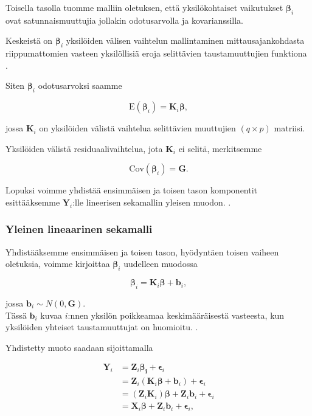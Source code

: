 \documentclass[finnish]{docopts}
\begin{document}
Toisella tasolla tuomme malliin oletuksen, että yksilökohtaiset vaikutukset $\bm{\beta}_i$ ovat satunnaismuuttujia jollakin odotusarvolla ja kovarianssilla.

Keskeistä on $\bm{\beta}_i$ yksilöiden välisen vaihtelun mallintaminen mittausajankohdasta riippumattomien vasteen yksilöllisiä eroja selittävien taustamuuttujien funktiona \citep{fitzmaurice11}.

Siten $\bm{\beta}_i$ odotusarvoksi saamme

$$
\text{E}(\bm{\beta}_i) = \bm{K}_i \bm{\beta},
$$

jossa $\bm{K}_i$ on yksilöiden välistä vaihtelua selittävien muuttujien $(q \times p)$ matriisi.

Yksilöiden välistä residuaalivaihtelua, jota $\bm{K}_i$ ei selitä, merkitsemme

$$
\text{Cov}(\bm{\beta}_i) = \bm{G}.
$$

Lopuksi voimme yhdistää ensimmäisen ja toisen tason komponentit esittääksemme $\bm{Y}_i$:lle lineerisen sekamallin yleisen muodon. \citep{fitzmaurice11, verbeke00}.\\

\subsubsection{Yleinen lineaarinen sekamalli}
\label{ssb:ylsm}

Yhdistääksemme ensimmäisen ja toisen tason, hyödyntäen toisen vaiheen oletuksia, voimme kirjoittaa $\bm{\beta}_i$ uudelleen muodossa

$$
\bm{\beta}_i = \bm{K}_i \bm{\beta} + \bm{b}_i,
$$

jossa $\bm{b}_i \sim N(0,\bm{G})$. \\

Tässä $\bm{b}_i$ kuvaa $i$:nnen yksilön poikkeamaa keskimääräisestä vasteesta, kun yksilöiden yhteiset taustamuuttujat on huomioitu. \citep{fitzmaurice11}.

Yhdistetty muoto saadaan sijoittamalla

$$
\begin{aligned}
\bm{Y}_i &= \bm{Z}_i \bm{\beta_i} + \bm{\epsilon}_i \\
&= \bm{Z}_i (\bm{K}_i \bm{\beta} + \bm{b}_i) + \bm{\epsilon}_i \\
&= (\bm{Z}_i \bm{K}_i) \bm{\beta} + \bm{Z}_i \bm{b}_i + \bm{\epsilon}_i \\
&= \bm{X}_i \bm{\beta} + \bm{Z}_i \bm{b}_i + \bm{\epsilon}_i, \\
\end{aligned}
$$
\end{document}
